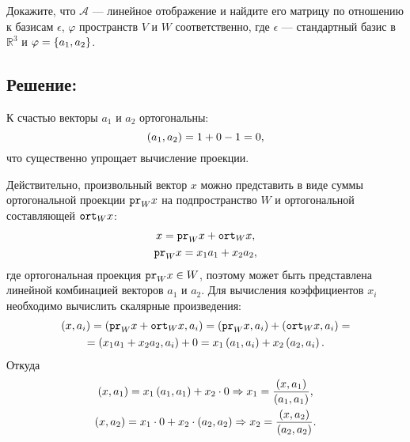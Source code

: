 \documentclass[12pt]{article}
\begin{document}
    Докажите, что $\mathcal{A}$ --- линейное отображение и найдите его матрицу по отношению к базисам $\epsilon$, $\varphi$ пространств $V$ и $W$ соответственно, где $\epsilon$ ---
    стандартный базис в $\mathbb{R}^3$ и $\varphi = \left \{ a_1, a_2 \right \}$.

    \subsection*{Решение:}
    К счастью векторы $a_1$ и $a_2$ ортогональны:
    \[
        \left ( a_1, a_2 \right ) = 1 + 0 - 1 = 0,
    \]
    что существенно упрощает вычисление проекции.

        {
        \color{blue}
        Действительно, произвольный вектор $x$ можно представить в виде суммы ортогональной проекции $\texttt{pr}_{W} {x}$ на подпространство $W$ и ортогональной составляющей
        $\texttt{ort}_{W} {x}$:
        \begin{gather*}
            x = \texttt{pr}_{W} {x} + \texttt{ort}_{W} {x}, \\
            \texttt{pr}_{W} {x} = x_1 a_1 + x_2 a_2 ,
        \end{gather*}
        где ортогональная проекция $\texttt{pr}_{W} {x} \in W$, поэтому может быть представлена линейной комбинацией векторов $a_1$ и $a_2$. Для вычисления коэффициентов $x_i$
        необходимо вычислить скалярные произведения:
        \begin{multline*}
            \left ( x, a_i \right )
            = \left ( \texttt{pr}_{W} {x} + \texttt{ort}_{W} {x}, a_i \right )
            = \left ( \texttt{pr}_{W} {x}, a_i \right ) + \left ( \texttt{ort}_{W} {x}, a_i \right ) = \\
            = \left ( x_1 a_1 + x_2 a_2, a_i \right ) + 0
            = x_1 \left ( a_1, a_i \right ) + x_2 \left ( a_2, a_i \right ).
        \end{multline*}
        Откуда
        \begin{gather*}
            \left ( x, a_1 \right ) = x_1 \left ( a_1, a_1 \right ) + x_2 \cdot 0 \Rightarrow x_1 = \frac{\left ( x, a_1 \right )}{\left ( a_1, a_1 \right )} , \\
            \left ( x, a_2 \right ) = x_1 \cdot 0 + x_2 \cdot \left ( a_2, a_2 \right ) \Rightarrow x_2 = \frac{\left ( x, a_2 \right )}{\left ( a_2, a_2 \right )} .
        \end{gather*}
    }
\end{document}
